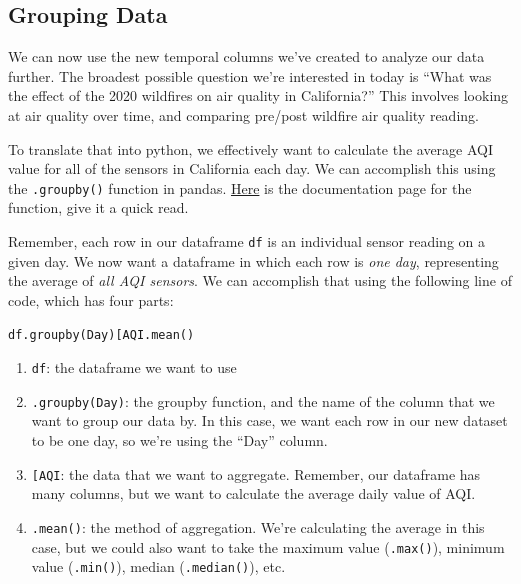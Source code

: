 \documentclass[
  letterpaper,
  DIV=11,
  numbers=noendperiod]{scrreprt}
\providecommand{\tightlist}{%
  \setlength{\itemsep}{0pt}\setlength{\parskip}{0pt}}\usepackage{longtable,booktabs,array}
\begin{document}
\hypertarget{grouping-data}{%
\subsection{Grouping Data}\label{grouping-data}}

We can now use the new temporal columns we've created to analyze our
data further. The broadest possible question we're interested in today
is ``What was the effect of the 2020 wildfires on air quality in
California?'' This involves looking at air quality over time, and
comparing pre/post wildfire air quality reading.

To translate that into python, we effectively want to calculate the
average AQI value for all of the sensors in California each day. We can
accomplish this using the \texttt{.groupby()} function in pandas.
\href{https://pandas.pydata.org/docs/reference/api/pandas.DataFrame.groupby.html}{Here}
is the documentation page for the function, give it a quick read.

Remember, each row in our dataframe \texttt{df} is an individual sensor
reading on a given day. We now want a dataframe in which each row is
\emph{one day}, representing the average of \emph{all AQI sensors}. We
can accomplish that using the following line of code, which has four
parts:

\texttt{df.groupby(\textquotesingle{}Day\textquotesingle{}){[}\textquotesingle{}AQI\textquotesingle{}{]}.mean()}

\begin{enumerate}
\def\labelenumi{\arabic{enumi}.}
\tightlist
\item
  \texttt{df}: the dataframe we want to use
\item
  \texttt{.groupby(\textquotesingle{}Day\textquotesingle{})}: the
  groupby function, and the name of the column that we want to group our
  data by. In this case, we want each row in our new dataset to be one
  day, so we're using the ``Day'' column.
\item
  \texttt{{[}\textquotesingle{}AQI\textquotesingle{}{]}}: the data that
  we want to aggregate. Remember, our dataframe has many columns, but we
  want to calculate the average daily value of AQI.
\item
  \texttt{.mean()}: the method of aggregation. We're calculating the
  average in this case, but we could also want to take the maximum value
  (\texttt{.max()}), minimum value (\texttt{.min()}), median
  (\texttt{.median()}), etc.
\end{enumerate}
\end{document}
